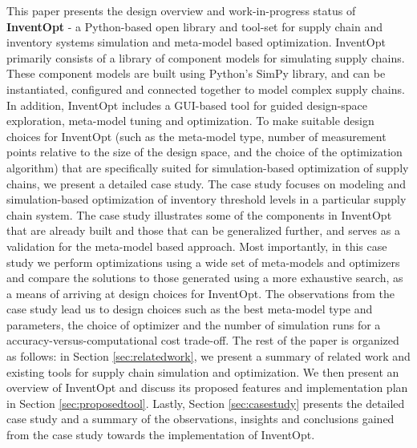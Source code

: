 This paper presents the design overview and work-in-progress status of \textbf{InventOpt} - a Python-based open library and tool-set  for supply chain and inventory systems simulation and meta-model based optimization.  InventOpt primarily consists of  a library of component models for simulating supply chains. These component models are built using Python's SimPy library, and can be instantiated, configured and connected together to model complex supply chains. In addition, InventOpt includes a GUI-based tool for guided design-space exploration, meta-model tuning and optimization. To make suitable design choices for InventOpt (such as the meta-model type, number of measurement points relative to the size of the design space, and the choice of the optimization algorithm) that are specifically suited for simulation-based optimization of supply chains, we present a detailed case study.  
%
The case study focuses on modeling and simulation-based optimization of inventory threshold levels in a particular supply chain system. The case study illustrates some of the components in InventOpt that are already built and those that can be generalized further, and serves as a validation for the meta-model based approach. Most importantly, in this case study we perform optimizations using a wide set of meta-models and optimizers and compare the solutions to those generated using a more exhaustive search, as a means of arriving at design choices for InventOpt. The observations from the case study lead us to design choices such as the best meta-model type and parameters, the choice of optimizer and the number of simulation runs for a accuracy-versus-computational cost trade-off.
%
The rest of the paper is organized as follows: in Section \ref{sec:relatedwork}, we present a summary of related work and existing tools for supply chain simulation and optimization. We then present an overview of InventOpt and discuss its proposed features and implementation plan in Section \ref{sec:proposedtool}.  Lastly, Section \ref{sec:casestudy} presents the detailed case study and a summary of the observations, insights and conclusions gained from the case study towards the implementation of InventOpt.

